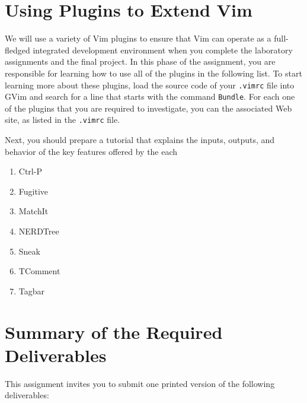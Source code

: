 \section*{Using Plugins to Extend Vim}

We will use a variety of Vim plugins to ensure that Vim can operate as a full-fledged integrated development environment
when you complete the laboratory assignments and the final project.  In this phase of the assignment, you are
responsible for learning how to use all of the plugins in the following list.  To start learning more about these plugins, load
the source code of your {\tt .vimrc} file into GVim and search for a line that starts with the command {\tt Bundle}.  For
each one of the plugins that you are required to investigate, you can the associated Web site, as listed in the {\tt .vimrc} file. 

Next, you should prepare a tutorial that explains the inputs, outputs, and behavior of the key features offered by the each


\begin{enumerate}

  \item Ctrl-P 
  \item Fugitive
  \item MatchIt
  \item NERDTree
  \item Sneak
  \item TComment
  \item Tagbar

\end{enumerate}



\section*{Summary of the Required Deliverables}

  This assignment invites you to submit one printed version of the following deliverables:

